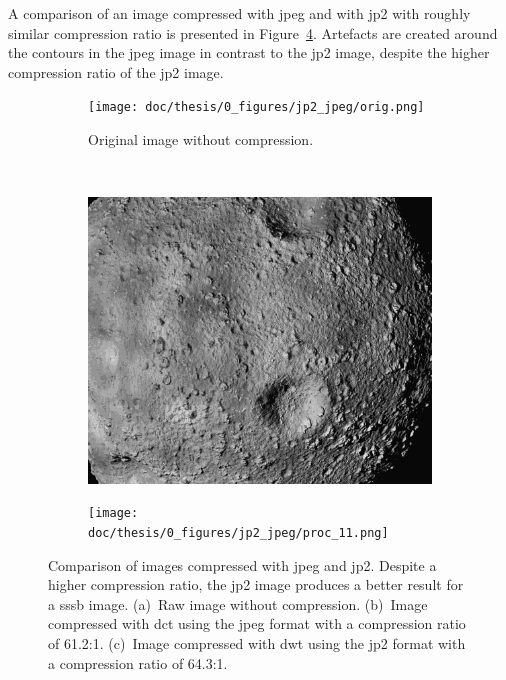 A comparison of an image compressed with \gls{jpeg} and with \gls{jp2} with roughly similar compression ratio is presented in Figure~\ref{fig:jpg_jp2_comparison}. Artefacts are created around the contours in the \gls{jpeg} image in contrast to the \gls{jp2} image, despite the higher compression ratio of the \gls{jp2} image.
\begin{figure}[htb]
    \centering
    \begin{subfigure}[b]{0.7\textwidth}
        \texttt{[image: doc/thesis/0\_figures/jp2\_jpeg/orig.png]}
        \caption{Original image without compression.}
        \label{fig:jpg_jp2_oirg}
    \end{subfigure}
    \\
    \begin{subfigure}[b]{0.48\textwidth}
        \includegraphics[width=\textwidth]{doc/thesis/0_figures/jp2_jpeg/proc_5.jpg}
        \caption{}
        \label{fig:jpg_jp2_jpeg}
    \end{subfigure}
    \begin{subfigure}[b]{0.48\textwidth}
        \texttt{[image: doc/thesis/0\_figures/jp2\_jpeg/proc\_11.png]}
        \caption{}
        \label{fig:jpg_jp2_jp2}
    \end{subfigure}
    \caption{Comparison of images compressed with \gls{jpeg} and \gls{jp2}. Despite a higher compression ratio, the \gls{jp2} image produces a better result for a \gls{sssb} image. (a)~Raw image without compression. (b)~Image compressed with \gls{dct} using the \gls{jpeg} format with a compression ratio of 61.2:1. (c)~Image compressed with \gls{dwt} using the \gls{jp2} format with a compression ratio of 64.3:1.}
    \label{fig:jpg_jp2_comparison}
\end{figure}


